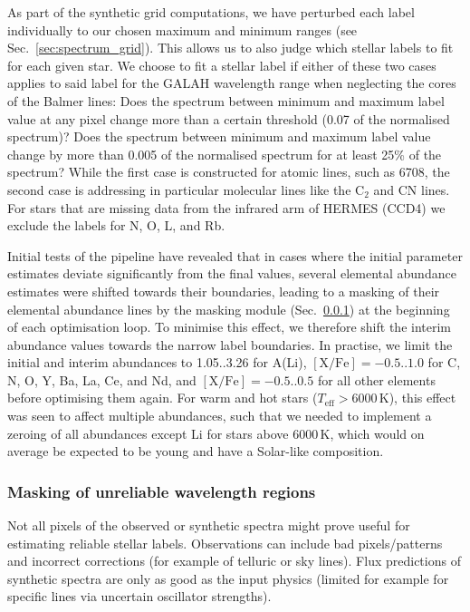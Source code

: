 \documentclass[
  journal=pasa,
  manuscript=research-paper, %
  year=2023,
  volume=37
]{cup-journal}
\newcommand\ion[2]{\text{#1\,\textsc{\lowercase{#2}}}}	%
\newcommand{\K}{\,\mathrm{K}}	%
\begin{document}
As part of the synthetic grid computations, we have perturbed each label individually to our chosen maximum and minimum ranges (see Sec.~\ref{sec:spectrum_grid}). This allows us to also judge which stellar labels to fit for each given star. We choose to fit a stellar label if either of these two cases applies to said label for the GALAH wavelength range when neglecting the cores of the Balmer lines: Does the spectrum between minimum and maximum label value at any pixel change more than a certain threshold (0.07 of the normalised spectrum)? Does the spectrum between minimum and maximum label value change by more than 0.005 of the normalised spectrum for at least 25\% of the spectrum? While the first case is constructed for atomic lines, such as \ion{Li}{i} 6708, the second case is addressing in particular molecular lines like the $\mathrm{C_2}$ and $\mathrm{CN}$ lines. For stars that are missing data from the infrared arm of HERMES (CCD4) we exclude the 
labels for N, O, L, and Rb.

Initial tests of the pipeline have revealed that in cases where the initial parameter estimates deviate significantly from the final values, several elemental abundance estimates were shifted towards their boundaries, leading to a masking of their elemental abundance lines by the masking module (Sec.~\ref{sec:masking_of_unreliable_wavelength_regions}) at the beginning of each optimisation loop. To minimise this effect, we therefore shift the interim abundance values towards the narrow label boundaries. In practise, we limit the initial and interim abundances to 1.05..3.26 for A(Li), $\mathrm{[X/Fe]} = -0.5..1.0$ for C, N, O, Y, Ba, La, Ce, and Nd, and $\mathrm{[X/Fe]} = -0.5..0.5$ for all other elements before optimising them again. For warm and hot stars ($T_\text{eff} > 6000\K$), this effect was seen to affect multiple abundances, such that we needed to implement a zeroing of all abundances except Li for stars above $6000\K$, which would on average be expected to be young and have a Solar-like composition.

\subsubsection{Masking of unreliable wavelength regions} \label{sec:masking_of_unreliable_wavelength_regions}

Not all pixels of the observed or synthetic spectra might prove useful for estimating reliable stellar labels. Observations can include bad pixels/patterns and incorrect corrections (for example of telluric or sky lines). Flux predictions of synthetic spectra are only as good as the input physics (limited for example for specific lines via uncertain oscillator strengths).
\end{document}
